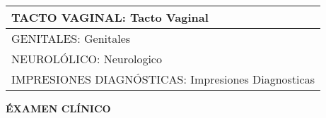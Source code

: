 \documentclass[10pt,a4paper]{article}
\begin{document}
{\begin{tabular}{|p{5.5cm} p{5.5cm} |}
\hline
\multicolumn{2}{|l|}{\begin{minipage}[t]{12.5 cm}\scriptsize{TACTO VAGINAL: Tacto Vaginal}\end{minipage}}\\
\hline
\multicolumn{2}{|l|}{\begin{minipage}[t]{12.5 cm}\scriptsize{GENITALES: Genitales}\end{minipage}}\\
\hline
\multicolumn{2}{|l|}{\begin{minipage}[t]{12.5 cm}\scriptsize{NEUROL\'OLICO: Neurologico	}\end{minipage}}\\
\hline
\multicolumn{2}{|l|}{\begin{minipage}[t]{12.5 cm}\scriptsize{IMPRESIONES DIAGN\'OSTICAS: Impresiones Diagnosticas}\end{minipage}}\\
\hline
\end{tabular}}
\vspace{0.6cm}
\begin{flushleft}
\begin{LARGE}
\textbf{\'EXAMEN CL\'INICO}
\end{LARGE}
\end{flushleft}
\end{document}

